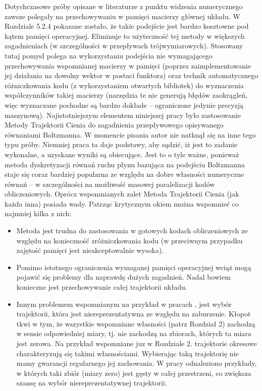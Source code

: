 \documentclass[12pt, twoside]{book}
\begin{document}
Dotychczasowe próby opisane w literaturze z punktu widzenia numerycznego zawsze polegały na przechowywaniu w pamięci macierzy głównej układu. W Rozdziale 5.2.4 pokazane zostało, że takie podejście jest bardzo kosztowne pod kątem pamięci operacyjnej. Eliminuje to użyteczność tej metody w większych zagadnieniach (w szczególności w przepływach trójwymiarowych). Stosowany tutaj pomysł polega na wykorzystaniu podejścia nie wymagającego przechowywania wspomnianej macierzy w pamięci (poprzez zaimplementowanie jej działania na dowolny wektor w postaci funktora) oraz technik automatycznego różniczkowania kodu (z wykorzystaniem otwartych bibliotek) do wyznaczenia współczynników takiej macierzy (narzędzia te nie generują błędów zaokrągleń, więc wyznaczane pochodne są bardzo dokłade – ograniczone jedynie precyzją maszynową). \newline
Najistotniejszym elementem niniejszej pracy było zastosowanie Metody Trajektorii Cienia do zagadnienia przepływowego opisywanego równaniami Boltzmanna. W momencie pisania autor nie natknął się na inne tego typu próby. Niemniej praca ta daje podstawy, aby sądzić, iż jest to zadanie wykonalne, a uzyskane wyniki są obiecujące. Jest to o tyle ważne, ponieważ metoda dyskretyzacji równań ruchu płynu bazująca na podejściu Boltzmanna staje się coraz bardziej popularna ze względu na dobre własności numeryczne równań – w szczególności na możliwość masowej paralelizacji kodów obliczeniowych. 
Oprócz wspomnianych zalet Metoda Trajektorii Cienia (jak każda inna) posiada wady. Patrząc krytycznym okiem można wspomnieć co najmniej kilka z nich:
\begin{itemize}
	\item Metoda jest trudna do zastosowania w gotowych kodach obliczeniowych ze względu na konieczność zróżniczkowania kodu (w przeciwnym przypadku zajętość pamięci jest nieakceptowalnie wysoka).
	\item Pomimo istotnego ograniczenia wymaganej pamięci operacyjnej wciąż mogą pojawić się problemy dla naprawdę dużych zagadnień. Nadal bowiem konieczne jest przechowywanie całej trajektorii układu.
	\item Innym problemem wspomnianym na przykład w pracach \cite{Chandramoorthy2}, \cite{Chandramoorthy3} jest wybór trajektorii, która jest niereprezentatywna ze względu na zaburzenie. Kłopot tkwi w tym, że wszystkie wspomniane własności (patrz Rozdział 2) zachodzą w sensie odpowiedniej miary, tj. nie zachodzą na zbiorach, których ta miara jest zerowa. Na przykład wspomniane juz w Rozdziale 2. trajektorie okresowe charakteryzują się takimi własnościami. Wybierając taką trajektorię nie mamy gwarancji regularnego jej zachowania. W pracy \cite{Grebogi} odnaleziono przykłady, w których taki zbiór (miary zero) jest gęsty w całej przestrzeni, co zwiększa szansę na wybór niereprezentatywnej trajektorii.
\end{itemize}
\end{document}
